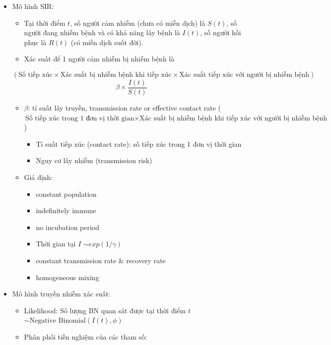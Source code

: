 \documentclass[
]{book}
\providecommand{\tightlist}{%
  \setlength{\itemsep}{0pt}\setlength{\parskip}{0pt}}
\begin{document}
\begin{itemize}
\tightlist
\item
  Mô hình SIR:

  \begin{itemize}
  \tightlist
  \item
    Tại thời điểm \(t\), số người cảm nhiễm (chưa có miễn dịch) là \(S(t)\), số người đang nhiễm bệnh và có khả năng lây bệnh là \(I(t)\), số người hồi phục là \(R(t)\) (có miễn dịch suốt đời).
  \item
    Xác suất để 1 người cảm nhiễm bị nhiễm bệnh là
  \end{itemize}

  \[ (\text{Số tiếp xúc} \times \text{Xác suất bị nhiễm bệnh khi tiếp xúc} \times \text{Xác suất tiếp xúc với người bị nhiễm bệnh})\]
  \[ \beta \times \dfrac{I(t)}{S(t)}\]

  \begin{itemize}
  \tightlist
  \item
    \(\beta\): tỉ suất lây truyền, transmission rate or effective contact rate (\(\text{Số tiếp xúc trong 1 đơn vị thời gian} \times \text{Xác suất bị nhiễm bệnh khi tiếp xúc với người bị nhiễm bệnh}\))

    \begin{itemize}
    \tightlist
    \item
      Tỉ suất tiếp xúc (contact rate): số tiếp xúc trong 1 đơn vị thời gian
    \item
      Nguy cơ lây nhiễm (transmission risk)
    \end{itemize}
  \item
    Giả định:

    \begin{itemize}
    \tightlist
    \item
      constant population
    \item
      indefinitely immune
    \item
      no incubation period
    \item
      Thời gian tại \(I\) \(\sim exp(1/\gamma)\)
    \item
      constant transmission rate \& recovery rate
    \item
      homogeneous mixing
    \end{itemize}
  \end{itemize}
\item
  Mô hình truyền nhiễm xác suất:

  \begin{itemize}
  \tightlist
  \item
    Likelihood: Số lượng BN quan sát được tại thời điểm \(t\) \(\sim \text{Negative Binomial}(I(t), \phi)\)
  \item
    Phân phối tiền nghiệm của các tham số:


\end{itemize}
\end{itemize}
\end{document}
